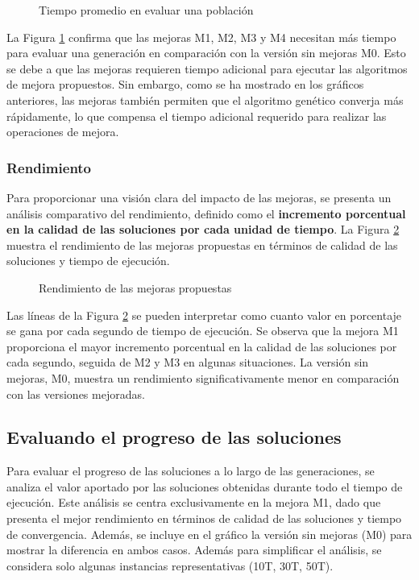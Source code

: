 \begin{figure}[H]
    \centering
    
    \caption{Tiempo promedio en evaluar una población}
    \label{fig:tiempo_generacion}
\end{figure}

La Figura \ref{fig:tiempo_generacion} confirma que las mejoras M1, M2, M3 y M4 necesitan más tiempo para evaluar una generación en comparación con la versión sin mejoras M0. Esto se debe a que las mejoras requieren tiempo adicional para ejecutar las algoritmos de mejora propuestos. Sin embargo, como se ha mostrado en los gráficos anteriores, las mejoras también permiten que el algoritmo genético converja más rápidamente, lo que compensa el tiempo adicional requerido para realizar las operaciones de mejora.

\subsubsection{Rendimiento}

Para proporcionar una visión clara del impacto de las mejoras, se presenta un análisis comparativo del rendimiento, definido como el \textbf{incremento porcentual en la calidad de las soluciones por cada unidad de tiempo}. La Figura \ref{fig:rendimiento} muestra el rendimiento de las mejoras propuestas en términos de calidad de las soluciones y tiempo de ejecución.

\begin{figure}[H]
    \centering
    
    \caption{Rendimiento de las mejoras propuestas}
    \label{fig:rendimiento}
\end{figure}

Las líneas de la Figura \ref{fig:rendimiento} se pueden interpretar como cuanto valor en porcentaje se gana por cada segundo de tiempo de ejecución. Se observa que la mejora M1 proporciona el mayor incremento porcentual en la calidad de las soluciones por cada segundo, seguida de M2 y M3 en algunas situaciones. La versión sin mejoras, M0, muestra un rendimiento significativamente menor en comparación con las versiones mejoradas.

\subsection{Evaluando el progreso de las soluciones}

Para evaluar el progreso de las soluciones a lo largo de las generaciones, se analiza el valor aportado por las soluciones obtenidas durante todo el tiempo de ejecución. Este análisis se centra exclusivamente en la mejora M1, dado que presenta el mejor rendimiento en términos de calidad de las soluciones y tiempo de convergencia. Además, se incluye en el gráfico la versión sin mejoras (M0) para mostrar la diferencia en ambos casos. Además para simplificar el análisis, se considera solo algunas instancias representativas (10T, 30T, 50T).

